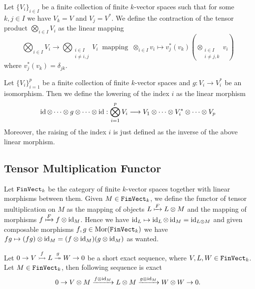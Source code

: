 \begin{definition}[Contraction]
    Let \(\{V_i\}_{i \in I}\) be a finite collection of finite \(k\)-vector spaces
    such that for some \(k, j \in I\) we have \(V_k = V\) and \(V_j = V^*\). We
    define the contraction of the tensor product \(\bigotimes_{i \in I} V_i\) as
    the linear mapping
    \[
        \bigotimes_{i \in I} V_i \longrightarrow \bigotimes_{\substack{i \in I \\ i
                \neq i, j}} V_i\ \text{ mapping }\
        \otimes_{i \in I} v_i \longmapsto
        v_j^*(v_k) (\otimes_{\substack{i \in I\\ i \neq j, k}} v_i)
    \]
    where \(v_j^*(v_k) = \delta_{jk}\).
\end{definition}

\begin{definition}
    Let \(\{V_i\}_{i=1}^p\) be a finite collection of finite \(k\)-vector spaces
    and \(g: V_i \to V_i^*\) be an isomorphism. Then we define the lowering of the
    index \(i\) as the linear morphism
    \[
        \operatorname{id} \otimes \dots \otimes g \otimes \dots \otimes \operatorname{id}:
        \bigotimes_{i=1}^p V_i \longrightarrow
        V_1 \otimes \dots \otimes V_i^* \otimes \dots \otimes V_p
    \]
    Moreover, the raising of the index \(i\) is just defined as the inverse of the
    above linear morphism.
\end{definition}

\subsection{Tensor Multiplication Functor}

\begin{definition}
    Let \({\texttt{FinVect}}_k\) be the category of finite \(k\)-vector spaces together
    with linear morphisms between them. Given \(M \in {\texttt{FinVect}}_k\), we define
    the functor of tensor multiplication on \(M\) as the mapping of objects \(L
    \xmapsto F L \otimes M\) and the mapping of morphisms \(f \xmapsto F f \otimes
    \operatorname{id}_M\). Hence we have \(\operatorname{id}_L \mapsto \operatorname{id}_L \otimes \operatorname{id}_M = \operatorname{id}_{L \otimes
        M}\) and given composable morphisms \(f, g \in \operatorname{Mor}({\texttt{FinVect}}_k)\) we have
    \(f g \mapsto (f g) \otimes \operatorname{id}_M = (f \otimes \operatorname{id}_M) (g
    \otimes \operatorname{id}_M)\) as wanted.
\end{definition}

\begin{proposition}[Exactness]
    Let \(0 \to V \overset{f}{\rightarrowtail} L \overset{g}{\twoheadrightarrow} W \to
    0\) be a short exact sequence, where \(V, L, W \in {\texttt{FinVect}}_k\). Let \(M
    \in {\texttt{FinVect}}_k\), then following sequence is exact
    \[
        0 \to V \otimes M \xrightarrow{f \otimes \operatorname{id}_M}
        L \otimes M \xrightarrow{g \otimes \operatorname{id}_M} W \otimes W \to 0.
    \]
\end{proposition}

